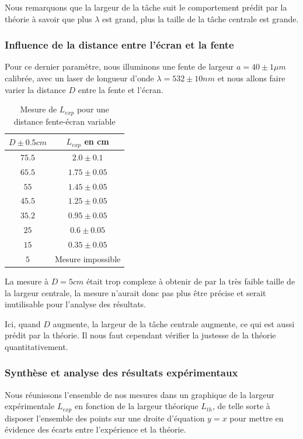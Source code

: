 \documentclass[12pt]{article}
\begin{document}
Nous remarquons que la largeur de la tâche suit le comportement prédit par la théorie à savoir que plus $\lambda$ est grand, plus la taille de la tâche centrale est grande.

\break
\subsubsection{Influence de la distance entre l'écran et la fente}
Pour ce dernier paramètre, nous illuminons une fente de largeur $a = 40 \pm 1 \mu m$ calibrée, avec un laser de longueur d'onde $\lambda = 532 \pm 10 nm$ et nous allons faire varier la distance $D$ entre la fente et l'écran.

\begin{table}[h!]
	\centering
	\begin{tabular}{||c c||} 
		\hline
		$D \pm 0.5 cm$ & $L_{exp}$ en cm \\
		\hline\hline
		\footnotesize
        $75.5$      &  $2.0 \pm 0.1$ \\ 
        $65.5$      &  $1.75 \pm 0.05$ \\ 
        $55$        &  $1.45 \pm 0.05$ \\ 
        $45.5$      &  $1.25 \pm 0.05$ \\ 
        $35.2$      &  $0.95 \pm 0.05$ \\ 
        $25$        &  $0.6 \pm 0.05$ \\ 
        $15$        &  $0.35 \pm 0.05$ \\ 
        $5$         &  Mesure impossible \\ 
		\hline
	\end{tabular}
	\caption{Mesure de $L_{exp}$ pour une distance fente-écran variable}
	\label{table:3}
\end{table}

La mesure à $D = 5cm$ était trop complexe à obtenir de par la très faible taille de la largeur centrale, la mesure n'aurait donc pas plus être précise et serait inutilisable pour l'analyse des résultats.

Ici, quand $D$ augmente, la largeur de la tâche centrale augmente, ce qui est aussi prédit par la théorie. Il nous faut cependant vérifier la justesse de la théorie quantitativement.

\subsubsection{Synthèse et analyse des résultats expérimentaux}
Nous réunissons l'ensemble de nos mesures dans un graphique de la largeur expérimentale $L_{exp}$ en fonction de la largeur théorique $L_{th}$, de telle sorte à disposer l'ensemble des points 
sur une droite d'équation $y=x$ pour mettre en évidence des écarts entre l'expérience et la théorie. 
\end{document}
